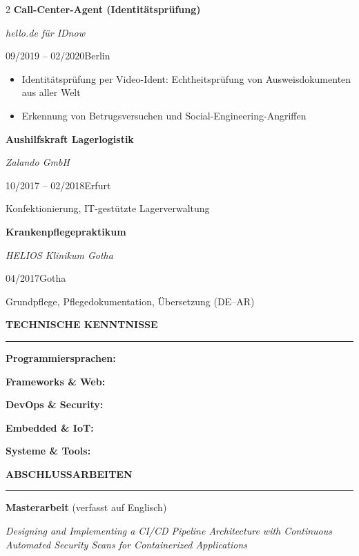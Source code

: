 \documentclass[10pt,a4paper]{article}
\newcommand{\cvsection}[1]{%
  \vspace{7pt}%
  {\large\bfseries\MakeUppercase{#1}}\\[-7pt]
  \rule{\linewidth}{0.6pt}\par\vspace{4pt}}
\newcommand{\cventry}[4]{%
  {\bfseries #1}\par
  {\itshape\color{black!75}#2}\par
  {\small\color{softgray}#3\hspace{1.2em}#4}\par\vspace{3pt}}
\newenvironment{cvitems}{%
  \begin{itemize}[leftmargin=1.2em,topsep=3pt,itemsep=2pt,parsep=0pt,label=\textbullet]}%
  {\end{itemize}\vspace{4pt}}
\newcommand{\skillhead}[1]{%
  \par\vspace{2pt}%
  \colorbox{barbg}{\parbox{\dimexpr\linewidth-2\fboxsep}{\bfseries #1}}\par\vspace{3pt}}
\begin{document}
\begin{paracol}{2}
\cventry{Call-Center-Agent (Identitätsprüfung)}
        {hello.de für IDnow}
        {09/2019 – 02/2020}{Berlin}
\begin{cvitems}
  \item Identitätsprüfung per Video-Ident: Echtheitsprüfung von Ausweisdokumenten aus aller Welt
  \item Erkennung von Betrugsversuchen und Social-Engineering-Angriffen
\end{cvitems}
 
\cventry{Aushilfskraft Lagerlogistik}
        {Zalando GmbH}
        {10/2017 – 02/2018}{Erfurt}
{\small Konfektionierung, IT-gestützte Lagerverwaltung}\par\vspace{4pt}
 
\cventry{Krankenpflegepraktikum}
        {HELIOS Klinikum Gotha}
        {04/2017}{Gotha}
{\small Grundpflege, Pflegedokumentation, Übersetzung (DE–AR)}\par
 
\switchcolumn
 
\cvsection{Technische Kenntnisse}
{\raggedright
 
\skillhead{Programmiersprachen:}
    
 
\skillhead{Frameworks \& Web:}
   
 
\skillhead{DevOps \& Security:}
     
 
\skillhead{Embedded \& IoT:}
           
 
\skillhead{Systeme \& Tools:}
     \par}
 
\cvsection{Abschlussarbeiten}
 
{\bfseries Masterarbeit} {\small\color{softgray}(verfasst auf Englisch)}\par
\textit{Designing and Implementing a CI/CD Pipeline Architecture with Continuous Automated Security Scans for Containerized Applications}\par
\vspace{8pt}
 

\end{paracol}
\end{document}
